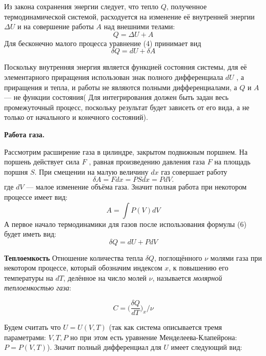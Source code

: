\documentclass[10pt]{article}
\begin{document}
    Из закона сохранения энергии следует, что тепло $Q$, полученное термодинамической системой, расходуется на изменение её внутренней энергии $\Delta U$ и на совершение работы $A$ над внешними телами:
    \begin{equation}
        Q = \Delta U + A
    \end{equation}
    Для бесконечно малого процесса уравнение (4) принимает вид 
    \begin{equation}
        \delta Q = dU + \delta A
    \end{equation}

    Поскольку внутренняя энергия является функцией состояния системы, для её элементарного приращения использован знак полного дифференциала $dU$ , а приращения и тепла, и работы не являются полными дифференциалами, а $Q$ и $A$ — не функции состояния(
    Для интегрирования должен быть задан весь промежуточный процесс, поскольку результат будет зависеть от его вида, а не только от начального и конечного состояний).

    \textbf{ Работа газа.}

    Рассмотрим расширение газа в цилиндре, закрытом подвижным поршнем. На поршень действует сила $F$ , равная произведению давления газа $F$ на площадь поршня $S$. При смещении на малую величину $dx$ газ совершает работу
    \begin{equation}
        \delta A = F dx = P S dx = P dV.
    \end{equation}
    где $dV$  — малое изменение объёма газа.
    Значит полная работа при некотором процессе имеет вид:
    \begin{equation}
        A = \int P(V) dV
    \end{equation}
    А первое начало термодинамики для газов после использования формулы (6) будет иметь вид:
    \begin{equation}
        \delta Q = dU + P dV
    \end{equation}

    \textbf{Теплоемкость}
    Отношение количества тепла $\delta Q$, поглощённого $\nu$ молями газа при некотором процессе, который обозначим индексом $x$, к повышению его температуры на $dT$, делённое на число молей $\nu$, называется \textit{молярной теплоемкостью газа}:

    \begin{equation}
        C = \bigg(\frac{\delta Q}{dT}\bigg)_x / \nu
    \end{equation}

    Будем считать что $U = U(V,T)$ (так как система описывается тремя параметрами: $V,T,P$ но при этом есть уравнение Менделеева-Клапейрона: $P = P(V,T)$).
    Значит полный дифференциал для $U$ имеет следующий вид:
\end{document}
